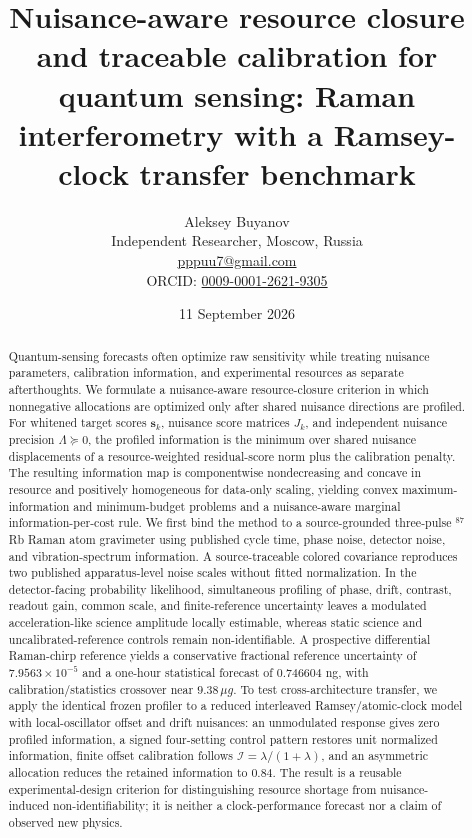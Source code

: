 \documentclass[12pt,a4paper]{article}
\begin{document}
\title{Nuisance-aware resource closure and traceable calibration for quantum sensing: Raman interferometry with a Ramsey-clock transfer benchmark}
\author{Aleksey Buyanov\\
\small Independent Researcher, Moscow, Russia\\
\small \href{mailto:pppuu7@gmail.com}{pppuu7@gmail.com}\\
\small ORCID: \href{https://orcid.org/0009-0001-2621-9305}{0009-0001-2621-9305}}
\date{11 September 2026}
\maketitle

\begin{abstract}
Quantum-sensing forecasts often optimize raw sensitivity while treating nuisance parameters, calibration information, and experimental resources as separate afterthoughts. We formulate a nuisance-aware resource-closure criterion in which nonnegative allocations are optimized only after shared nuisance directions are profiled. For whitened target scores $\bm s_k$, nuisance score matrices $J_k$, and independent nuisance precision $\Lambda\succeq0$, the profiled information is the minimum over shared nuisance displacements of a resource-weighted residual-score norm plus the calibration penalty. The resulting information map is componentwise nondecreasing and concave in resource and positively homogeneous for data-only scaling, yielding convex maximum-information and minimum-budget problems and a nuisance-aware marginal information-per-cost rule. We first bind the method to a source-grounded three-pulse $^{87}$Rb Raman atom gravimeter using published cycle time, phase noise, detector noise, and vibration-spectrum information. A source-traceable colored covariance reproduces two published apparatus-level noise scales without fitted normalization. In the detector-facing probability likelihood, simultaneous profiling of phase, drift, contrast, readout gain, common scale, and finite-reference uncertainty leaves a modulated acceleration-like science amplitude locally estimable, whereas static science and uncalibrated-reference controls remain non-identifiable. A prospective differential Raman-chirp reference yields a conservative fractional reference uncertainty of $7.9563\times10^{-5}$ and a one-hour statistical forecast of $0.746604$ ng, with calibration/statistics crossover near $9.38\,\mu g$. To test cross-architecture transfer, we apply the identical frozen profiler to a reduced interleaved Ramsey/atomic-clock model with local-oscillator offset and drift nuisances: an unmodulated response gives zero profiled information, a signed four-setting control pattern restores unit normalized information, finite offset calibration follows $\mathcal I=\lambda/(1+\lambda)$, and an asymmetric allocation reduces the retained information to $0.84$. The result is a reusable experimental-design criterion for distinguishing resource shortage from nuisance-induced non-identifiability; it is neither a clock-performance forecast nor a claim of observed new physics.
\end{abstract}
\end{document}
